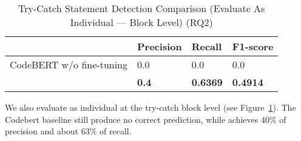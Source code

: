 \begin{table}[t]%
\caption{Try-Catch Statement Detection Comparison (Evaluate {\xstate} As Individual --- Block Level) (RQ2)}
  \vspace{-12pt}
  \small
	\begin{center}
		\renewcommand{\arraystretch}{1}
		\begin{tabular}{| p{3.05cm}<{\centering} | p{1.2cm}<{\centering} | p{1.2cm}<{\centering}| p{1.2cm}<{\centering}|}
		  \hline
			  & Precision  & Recall & F1-score \\
			\hline
			CodeBERT w/o fine-tuning &  0.0 & 0.0  & 0.0\\
			\hline
			{\xstate}  & \textbf{0.4}  &  \textbf{0.6369} & \textbf{0.4914}\\
			\hline
		\end{tabular}
		\label{tab:xstate-block}
	\end{center}
\end{table}

We also evaluate {\xstate} as individual at the try-catch block level (see Figure~\ref{tab:xstate-block}). The Codebert baseline still produce no correct prediction, while {\xstate} achieves 40\% of precision and about 63\% of recall. 


